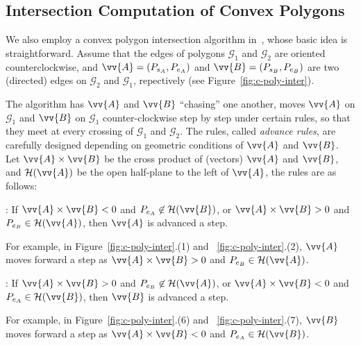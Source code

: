 \subsection{Intersection Computation of Convex Polygons}
\label{subsec-cpi}

We also employ a convex polygon intersection algorithm in~\cite{ORourke:Intersection}, whose basic idea is straightforward.
Assume \kwlog that the edges of polygons $\mathcal{G}_1$ and $\mathcal{G}_2$ are oriented counterclockwise, and $\vv{A} = (P_{s_A}, P_{e_A})$ and $\vv{B} = (P_{s_B}, P_{e_B})$ are two (directed) edges on $\mathcal{G}_2$ and $\mathcal{G}_1$, repectively (see Figure~\ref{fig:c-poly-inter}).

The algorithm has $\vv{A}$ and $\vv{B}$ ``chasing'' one another, \ie moves $\vv{A}$ on $\mathcal{G}_1$ and $\vv{B}$ on $\mathcal{G}_1$ counter-clockwise step by step under certain rules, so that they meet at every crossing of $\mathcal{G}_1$ and $\mathcal{G}_2$.
%
The rules, called \emph{advance rules}, are carefully designed depending on geometric conditions of $\vv{A}$ and $\vv{B}$.
Let $\vv{A} \times \vv{B}$ be the cross product of (vectors) $\vv{A}$ and $\vv{B}$, and $\mathcal{H}(\vv{A})$ be the open half-plane to the left of $\vv{A}$, the rules are as follows:

: If $\vv{A} \times \vv{B} < 0$ and $P_{e_A} \not \in \mathcal{H}(\vv{B})$, or $\vv{A} \times \vv{B} > 0$ and $P_{e_B} \in \mathcal{H}(\vv{A})$, then $\vv{A}$ is advanced a step.

For example, in Figure~\ref{fig:c-poly-inter}.(1) and ~\ref{fig:c-poly-inter}.(2), $\vv{A}$ moves forward a step as  $\vv{A} \times \vv{B} > 0$ and $P_{e_B} \in \mathcal{H}(\vv{A})$.

: If $\vv{A} \times \vv{B} > 0$ and $P_{e_B} \not \in \mathcal{H}(\vv{A})$, or $\vv{A} \times \vv{B} < 0$ and $P_{e_A} \in \mathcal{H}(\vv{B})$, then  $\vv{B}$ is advanced a step.

For example, in Figure~\ref{fig:c-poly-inter}.(6) and ~\ref{fig:c-poly-inter}.(7), $\vv{B}$ moves forward a step as $\vv{A} \times \vv{B} < 0$ and $P_{e_A} \in \mathcal{H}(\vv{B})$.


